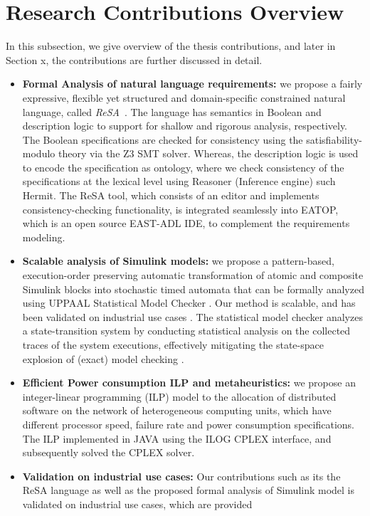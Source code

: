 \section{Research Contributions Overview}
In this subsection, we give overview of the thesis contributions, and later in Section x, the contributions are further discussed in detail.
\begin{itemize}
\item \textbf{Formal Analysis of natural language requirements:}  we propose a fairly expressive, flexible yet structured and domain-specific constrained natural language, called \textit{ReSA}~\cite{resatool}\cite{Mahmud2015ReSA:Systems}. The language has semantics in Boolean and description logic to support for shallow and rigorous analysis, respectively. The Boolean specifications are checked for consistency using the satisfiability-modulo theory via the Z3 SMT solver. Whereas, the description logic is used to encode the specification as ontology, where we check consistency of the specifications at the lexical level using Reasoner (Inference engine) such Hermit. The ReSA tool, which consists of an editor and implements consistency-checking functionality, is integrated seamlessly into EATOP, which is an open source EAST-ADL IDE, to complement the requirements modeling. 

\item \textbf{Scalable analysis of Simulink models:} we propose a pattern-based, execution-order preserving automatic transformation of atomic and composite Simulink blocks into stochastic timed automata that can be formally analyzed using UPPAAL Statistical Model Checker \cite{Bulychev2012UPPAAL-SMC:Automata}. Our method is scalable, and has been validated on industrial use cases \cite{Filipovikj2016SimulinkSystems}. The statistical model checker analyzes a state-transition system by conducting statistical analysis on the collected traces of the system executions, effectively mitigating the state-space explosion of (exact) model checking \cite{Legay2010StatisticalOverview}. 

\item \textbf{Efficient Power consumption ILP and metaheuristics:} we propose an integer-linear programming (ILP) model to the allocation of distributed software on the network of heterogeneous computing units, which have different processor speed, failure rate and power consumption specifications. The ILP implemented in JAVA using the ILOG CPLEX interface, and subsequently solved the CPLEX solver.
\item \textbf{Validation on industrial use cases: } 
Our contributions such as its the ReSA language as well as the proposed formal analysis of Simulink model is validated on industrial use cases, which are provided


\end{itemize}

